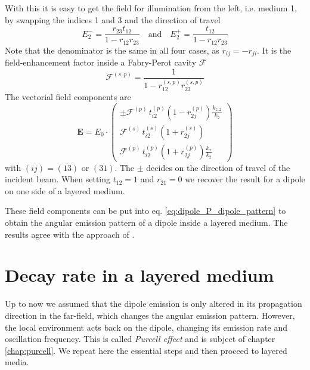 With this it is easy to get the field for illumination from the left, i.e. medium 1, by swapping the indices 1 and 3 and the direction of travel
\begin{equation}
E_2^- 
= \frac{r_{23} t_{12}  }{1 -r_{12}  r_{23}  }
 \quad
 \text{and}
 \quad
 E_2^+ 
  = \frac{t_{12}   }{1 -r_{12}  r_{23}  }
\end{equation}
Note that the denominator is the same in all four cases, as $r_{ij} = - r_{ji}$. It is the field-enhancement factor inside a Fabry-Perot cavity $\mathcal{F}$
\begin{equation}
\mathcal{F}^{(s,p)} = \frac{1  }{1 -r_{12}^{(s,p)}   r_{23}^{(s,p)}   }
\end{equation}
The vectorial field components are 
\begin{equation}
\mathbf{E} =  
 E_0 \cdot
\begin{pmatrix}
 \pm \mathcal{F}^{(p)} \,  t_{i2}^{(p)}  \left( 1 - r_{2j}^{(p)} \right) \frac{k_{z,2} }{ k_2} \\
\mathcal{F}^{(s)}  \, t_{i2}^{(s)}  \left( 1 + r_{2j}^{(s)} \right)  \\
\mathcal{F}^{(p)}  \, t_{i2}^{(p)}  \left( 1 + r_{2j}^{(p)} \right) \frac{k_{x} }{ k_2}
\end{pmatrix}
\end{equation}
with $(ij) = (13)$ or $(31)$. The $\pm$ decides on the direction of travel of the incident beam. When setting $t_{12} = 1$ and $r_{21} = 0$ we recover the result for a dipole on one side of a layered medium.

These field components can be put into eq. \ref{eq:dipole_P_dipole_pattern} to obtain the angular emission pattern of a dipole inside a layered medium. The results agree with the approach of \cite{Polerecky00}.



\section{Decay rate in a layered medium}

Up to now we assumed that the dipole emission is only altered in its propagation direction in the far-field, which changes the angular emission pattern. However, the local environment acts back on the dipole, changing its emission rate and oscillation frequency. This is called \emph{Purcell effect} and is subject of chapter \ref{chap:purcell}. We repeat here the essential steps and then proceed to layered media.


